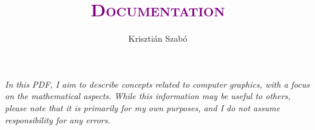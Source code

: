 \documentclass[12pt]{article}
\title{\textcolor{purple}{\Huge\textbf{\textsc{Documentation}}}}
\author{Krisztián Szabó}
\begin{document}
	\maketitle
	\textit{In this PDF, I aim to describe concepts related to computer graphics, with a focus on the mathematical aspects. While this information may be useful to others, please note that it is primarily for my own purposes, and I do not assume responsibility for any errors.}
	
	\tableofcontents
	\newpage
	
	\begin{comment}
		\section{From paper to the screen}
		In this chapter, we will draw a cube on the screen. Let’s explore what Vulkan offers for this purpose. After some initial setup, we can render to our display. How does this process actually work? How can we instruct Vulkan to perform the drawing? It's important to note that Vulkan uses a coordinate system that differs slightly from that of OpenGL, for example.
		
		
		\subsection{Canonical view volume}
		We can specify points in the view volume's space represented below.
		
		\begin{center}
			\tdplotsetmaincoords{60}{30}
			\begin{tikzpicture}[tdplot_main_coords, scale=2]	
				\coordinate (O) at (0,0,0);
				\coordinate (A) at (2,0,0);
				\coordinate (B) at (2,1,0);
				\coordinate (C) at (0,1,0);
				\coordinate (D) at (0,0,2);
				\coordinate (E) at (2,0,2);
				\coordinate (F) at (2,1,2);
				\coordinate (G) at (0,1,2);
				
				\draw (O) -- (A) -- (B) -- (C) -- cycle; %
				\draw (D) -- (E) -- (F) -- (G) -- cycle; %
				\draw (O) -- (D); %
				\draw (A) -- (E);
				\draw (B) -- (F);
				\draw (C) -- (G);
				
				\node at (D) [anchor=south east] {$(-1,-1,0)$};
				\node at (B) [anchor=north west] {$(1,1,1)$};
				
				\fill[blue!20,opacity=0.3] (O) -- (A) -- (E) -- (D) -- cycle;
				\fill[blue!20,opacity=0.3] (A) -- (B) -- (F) -- (E) -- cycle;
				\fill[blue!20,opacity=0.3] (B) -- (C) -- (G) -- (F) -- cycle;
				\fill[blue!20,opacity=0.3] (C) -- (O) -- (D) -- (G) -- cycle;
				\fill[blue!20,opacity=0.3] (D) -- (E) -- (F) -- (G) -- cycle;
				\fill[blue!20,opacity=0.3] (O) -- (A) -- (B) -- (C) -- cycle;
				

\end{comment}
\end{document}
